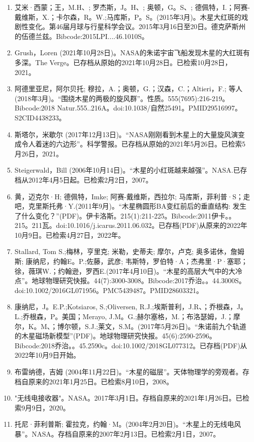 \begin{enumerate}
\item 艾米·西蒙；王，M.H、; 罗杰斯，J。H、; 奥顿，G。S、; 德佩特，I.；阿赛-戴维斯，X.；卡尔森，R。W.;马库斯，P。S。(2015年3月)。木星大红斑的戏剧性变化。第46届月球与行星科学会议。2015年3月16日至20日。德克萨斯州的伍德兰兹。Bibcode:2015LPI....46.1010S。
\item Grush，Loren (2021年10月28日)。NASA的朱诺宇宙飞船发现木星的大红斑有多深。The Verge。已存档从原始的2021年10月28日。已检索10月28日，2021。
\item 阿德里亚尼，阿尔贝托; 穆拉，A.；奥顿，G.；汉森，C.；Altieri，F.; 等人 (2018年3月)。“围绕木星的两极的旋风群”。性质。555(7695):216-219。Bibcode:2018 Natur.555..216A。doi:10.1038/自然25491。PMID29516997。S2CID4438233。  
\item 斯塔尔，米歇尔 (2017年12月13日)。“NASA刚刚看到木星上的大量旋风演变成令人着迷的六边形”。科学警报。已存档从原始的2021年5月26日。已检索5月26日，2021。
\item Steigerwald，Bill (2006年10月14日)。“木星的小红斑越来越强”。NASA.已存档从2012年4月5日起。已检索2月2日，2007。
\item 黄，迈克尔·H; 德佩特，Imke; 阿赛-戴维斯，西拉尔; 马库斯，菲利普·S；走吧，克里斯托弗·Y.(2011年9月)。“木星椭圆形BA变红前后的垂直结构: 发生了什么变化？”(PDF)。伊卡洛斯。215(1):211-225。Bibcode:2011伊卡。。215。211瓦。doi:10.1016/j.icarus.2011.06.032。已存档(PDF)从原来的2022年10月9日。已检索4月27日，2022年。
\item Stallard, Tom S.;梅林，亨里克; 米勒，史蒂夫; 摩尔，卢克; 奥多诺休，詹姆斯; 康纳尼，约翰E。P.;佐藤，武彦; 韦斯特，罗伯特·A；杰弗里·P·塞耶；徐，薇琪W.；约翰逊，罗西E.(2017年4月10日)。“木星的高层大气中的大冷点”。地球物理研究快报。44(7):3000-3008。Bibcode:2017乔治。。44.3000S。doi:10.1002/2016GL071956。PMC5439487。PMID28603321。  
\item 康纳尼，J。E.P.;Kotsiaros, S.;Oliversen, R.J.;埃斯普利，J.R、；乔根森，J。L.;乔根森，P。美国；Merayo, J.M。G.;赫尔塞格，M.；布洛瑟姆，J.；摩尔，K。M、；博尔顿，S.J.;莱文，S.M。(2017年5月26日)。“朱诺前九个轨道的木星磁场新模型”(PDF)。地球物理研究快报。45(6):2590-2596。Bibcode:2018乔治。。45.2590c。doi:10.1002/2018GL077312。已存档(PDF)从2022年10月9日开始。
\item 布雷纳德，吉姆 (2004年11月22日)。“木星的磁层”。天体物理学的旁观者。存档自原来的2021年1月25日。已检索8月10日，2008。
\item "无线电接收器"。NASA。2017年3月1日。存档自原来的2021年1月26日。已检索9月9日，2020。
\item 托尼·菲利普斯; 霍拉克，约翰·M。(2004年2月20日)。“木星上的无线电风暴”。NASA。存档自原来的2007年2月13日。已检索2月1日，2007。

\end{enumerate}
